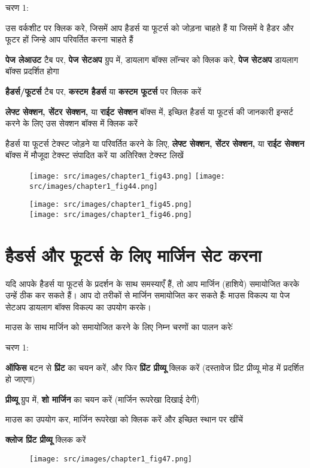 \begin{descriptionSimple}{चरण 1:}
\item[चरण 1] उस वर्कशीट पर क्लिक करे, जिसमें आप हैडर्स या फूटर्स को जोड़ना चाहते हैं या जिसमें वे हैडर और फूटर हों जिन्हे आप परिवर्तित करना चाहते हैं
\item[चरण 2] \textbf{पेज लेआउट} टैब पर, \textbf{पेज सेटअप} ग्रुप में, डायलाग बॉक्स लॉन्चर को क्लिक करे, \textbf{पेज सेटअप} डायलाग बॉक्स प्रदर्शित होगा
\item[चरण 3] \textbf{हैडर्स/फूटर्स} टैब पर, \textbf{कस्टम हैडर्स} या \textbf{कस्टम फूटर्स} पर क्लिक करें 
\item[चरण 4] \textbf{लेफ्ट सेक्शन, सेंटर सेक्शन,} या \textbf{राईट सेक्शन} बॉक्स में, इच्छित हैडर्स या फूटर्स की जानकारी इन्सर्ट करने के लिए उस सेक्शन बॉक्स में क्लिक करें
\item[चरण 5] हैडर्स या फूटर्स टेक्स्ट जोड़ने या परिवर्तित करने के लिए, \textbf{लेफ्ट सेक्शन, सेंटर सेक्शन,} या \textbf{राईट सेक्शन} बॉक्स में मौजूदा टेक्स्ट संपादित करें या अतिरिक्त टेक्स्ट लिखें
\end{descriptionSimple}	
\begin{figure}[H]
\centering
\texttt{[image: src/images/chapter1\_fig43.png]}\qquad
\texttt{[image: src/images/chapter1\_fig44.png]}
\end{figure}
\begin{figure}[H]
\centering
\texttt{[image: src/images/chapter1\_fig45.png]}\\[4pt]
\texttt{[image: src/images/chapter1\_fig46.png]}
\end{figure}
						
\section{हैडर्स और फूटर्स के लिए मार्जिन सेट करना}\label{id-1.24}

यदि आपके हैडर्स या फूटर्स के प्रदर्शन के साथ समस्याएँ हैं, तो आप मार्जिन (हाशिये) समायोजित करके उन्हें ठीक कर सकते हैं। आप दो तरीकों से मार्जिन समायोजित कर सकते हैंः माउस विकल्प या पेज सेटअप डायलाग बॉक्स विकल्प का उपयोग करके।


माउस के साथ मार्जिन को समायोजित करने के लिए निम्न चरणों का पालन करेःं

\begin{descriptionSimple}{चरण 1:}
\item[चरण 1] \textbf{ऑफिस} बटन से \textbf{प्रिंट} का चयन करें, और फिर \textbf{प्रिंट प्रीव्यू} क्लिक करें (दस्तावेज प्रिंट प्रीव्यू मोड में प्रदर्शित हो जाएगा)
\item[चरण 2] \textbf{प्रीव्यू} ग्रुप में, \textbf{शो मार्जिन} का चयन करें (मार्जिन रूपरेखा दिखाई देगी)
\item[चरण 3] माउस का उपयोग कर, मार्जिन रूपरेखा को क्लिक करें और इच्छित स्थान पर खींचें
\item[चरण 4] \textbf{क्लोज प्रिंट प्रीव्यू} क्लिक करें
\end{descriptionSimple}				
\begin{figure}[tbp]
\centering
\texttt{[image: src/images/chapter1\_fig47.png]}
\end{figure}

